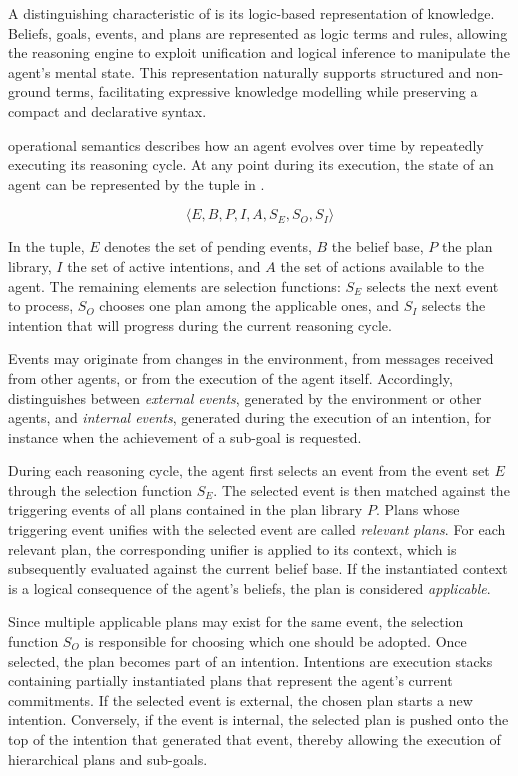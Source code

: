 A distinguishing characteristic of \agentspeak{} is its logic-based representation of knowledge. 
%
Beliefs, goals, events, and plans are represented as logic terms and rules, 
allowing the reasoning engine to exploit unification and logical inference to manipulate the agent's mental state. 
%
This representation naturally supports structured and non-ground terms,
facilitating expressive knowledge modelling while preserving a compact and declarative syntax.

\agentspeak{} operational semantics describes how 
an agent evolves over time by repeatedly executing its reasoning cycle. 
%
At any point during its execution, 
the state of an agent can be represented by the tuple in .

\begin{equation}\label{eq:agentspeak-tuple}
\langle E, B, P, I, A, S_E, S_O, S_I \rangle
\end{equation}

In the tuple,
$E$ denotes the set of pending events, 
$B$ the belief base, 
$P$ the plan library, 
$I$ the set of active intentions, 
and $A$ the set of actions available to the agent. 
%
The remaining elements are selection functions: 
$S_E$ selects the next event to process, 
$S_O$ chooses one plan among the applicable ones, 
and $S_I$ selects the intention that will progress during the current reasoning cycle.

Events may originate from changes in the environment, 
from messages received from other agents, 
or from the execution of the agent itself. 
%
Accordingly, 
\agentspeak{} distinguishes between \emph{external events}, 
generated by the environment or other agents, 
and \emph{internal events}, 
generated during the execution of an intention, 
for instance when the achievement of a sub-goal is requested.

During each reasoning cycle, 
the agent first selects an event from the event set $E$ 
through the selection function $S_E$. 
%
The selected event is then matched against the triggering events 
of all plans contained in the plan library $P$. 
%
Plans whose triggering event unifies with the selected event 
are called \emph{relevant plans}. 
%
For each relevant plan, 
the corresponding unifier is applied to its context, 
which is subsequently evaluated against the current belief base. 
%
If the instantiated context is a logical consequence of the agent's beliefs, 
the plan is considered \emph{applicable}.

Since multiple applicable plans may exist for the same event, 
the selection function $S_O$ is responsible for choosing which one should be adopted. 
%
Once selected, 
the plan becomes part of an intention. 
%
Intentions are execution stacks containing partially instantiated plans that represent the agent's current commitments. 
%
If the selected event is external, 
the chosen plan starts a new intention. 
%
Conversely, 
if the event is internal, 
the selected plan is pushed onto the top of the intention that generated that event, 
thereby allowing the execution of hierarchical plans and sub-goals.

